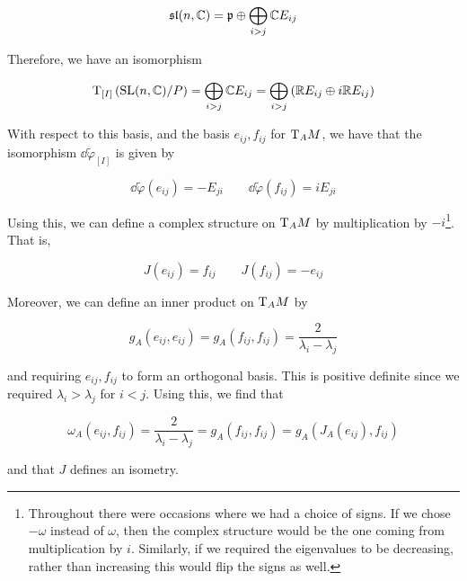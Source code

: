 \documentclass{article}
\renewcommand{\sl}{\mathfrak{sl}}
\renewcommand{\tilde}{\widetilde}
\begin{document}
\[\sl(n, \C) = \mfp \oplus \bigoplus_{i > j}\C E_{ij}\]

Therefore, we have an isomorphism

\[\mathrm{T}_{[I]}\left(\operatorname{SL}(n, \mathbb{C})/P\right) = \bigoplus_{i > j}\mathbb{C} E_{ij} = \bigoplus_{i > j}\left(\mathbb{R} E_{ij} \oplus i\mathbb{R} E_{ij}\right)\]

With respect to this basis, and the basis \(e_{ij}, f_{ij}\) for \(\mathrm{T}_AM\), we have that the isomorphism \(\dd\tilde\varphi_{[I]}\) is given by

\[\dd\tilde\varphi(e_{ij}) = -E_{ji} \qquad \dd\tilde\varphi(f_{ij}) = iE_{ji}\]

Using this, we can define a complex structure on \(\mathrm{T}_AM\) by multiplication by \(-i\)\footnote{Throughout there were occasions where we had a choice of signs. If we chose \(-\omega\) instead of \(\omega\), then the complex structure would be the one coming from multiplication by \(i\). Similarly, if we required the eigenvalues to be decreasing, rather than increasing this would flip the signs as well.}. That is,

\[J(e_{ij}) = f_{ij} \qquad J(f_{ij}) = -e_{ij}\]




Moreover, we can define an inner product on \(\mathrm{T}_AM\) by

\[g_A(e_{ij}, e_{ij}) = g_A(f_{ij}, f_{ij}) = \frac{2}{\lambda_i - \lambda_j}\]

and requiring \(e_{ij}, f_{ij}\) to form an orthogonal basis. This is positive definite since we required \(\lambda_i > \lambda_j\) for \(i < j\). Using this, we find that

\[\omega_A(e_{ij}, f_{ij}) = \frac{2}{\lambda_i - \lambda_j} = g_A(f_{ij}, f_{ij}) = g_A(J_A(e_{ij}), f_{ij})\]

and that \(J\) defines an isometry.
\end{document}
